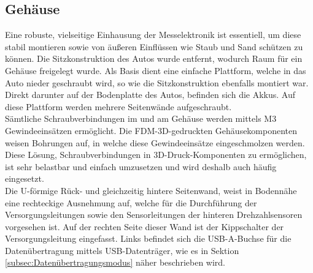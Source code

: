 \subsection{Gehäuse}
\label{subsec:elekCasing}
Eine robuste, vielseitige Einhausung der Messelektronik ist essentiell, um diese stabil montieren sowie von äußeren Einflüssen wie Staub und Sand schützen zu können. Die Sitzkonstruktion des Autos wurde entfernt, wodurch Raum für ein Gehäuse freigelegt wurde. Als Basis dient eine einfache Plattform, welche in das Auto nieder geschraubt wird, so wie die Sitzkonstruktion ebenfalls montiert war. Direkt darunter auf der Bodenplatte des Autos, befinden sich die Akkus. Auf diese Plattform werden mehrere Seitenwände aufgeschraubt.\\
Sämtliche Schraubverbindungen im und am Gehäuse werden mittels M3 Gewindeeinsätzen ermöglicht. Die \ac{FDM}-3D-gedruckten Gehäusekomponenten weisen Bohrungen auf, in welche diese Gewindeeinsätze eingeschmolzen werden. Diese Lösung, Schraubverbindungen in 3D-Druck-Komponenten zu ermöglichen, ist sehr belastbar und einfach umzusetzen und wird deshalb auch häufig eingesetzt. \\
Die U-förmige Rück- und gleichzeitig hintere Seitenwand, weist in Bodennähe eine rechteckige Ausnehmung auf, welche für die Durchführung der Versorgungsleitungen sowie den Sensorleitungen der hinteren Drehzahlsensoren vorgesehen ist. Auf der rechten Seite dieser Wand ist der Kippschalter der Versorgungsleitung eingefasst. Links befindet sich die \ac{USB}-A-Buchse für die Datenübertragung mittels \ac{USB}-Datenträger, wie es in Sektion \ref{subsec:Datenübertragungsmodus} näher beschrieben wird.